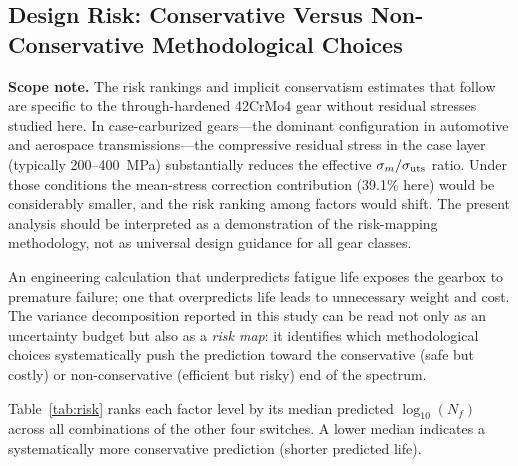 \documentclass[12pt,a4paper]{article}
\begin{document}
\subsection{Design Risk: Conservative Versus Non-Conservative Methodological Choices}

\textbf{Scope note.} The risk rankings and implicit conservatism
estimates that follow are specific to the through-hardened 42CrMo4
gear without residual stresses studied here. In case-carburized
gears---the dominant configuration in automotive and aerospace
transmissions---the compressive residual stress in the case layer
(typically 200--400~MPa) substantially reduces the effective
$\sigma_m/\sigma_{\rm uts}$ ratio. Under those conditions the
mean-stress correction contribution (39.1\% here) would be
considerably smaller, and the risk ranking among factors would shift.
The present analysis should be interpreted as a demonstration of the
risk-mapping methodology, not as universal design guidance for all
gear classes.

An engineering calculation that underpredicts fatigue life exposes the
gearbox to premature failure; one that overpredicts life leads to
unnecessary weight and cost. The variance decomposition reported in
this study can be read not only as an uncertainty budget but also as a
\emph{risk map}: it identifies which methodological choices
systematically push the prediction toward the conservative (safe but
costly) or non-conservative (efficient but risky) end of the spectrum.

Table~\ref{tab:risk} ranks each factor level by its median predicted
$\log_{10}(N_f)$ across all combinations of the other four switches.
A lower median indicates a systematically more conservative prediction
(shorter predicted life).
\end{document}
